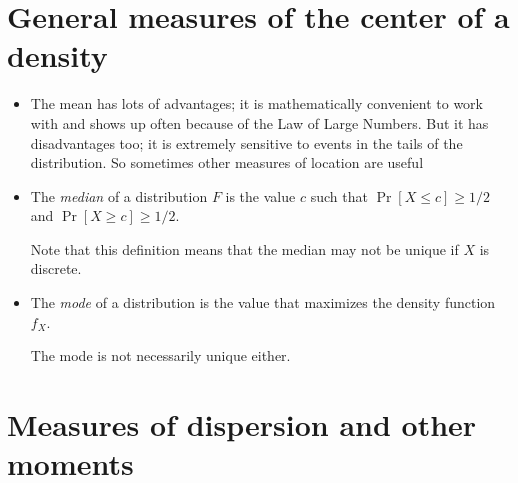 \begin{itemize}
\end{itemize}

\section{General measures of the center of a density}

\begin{itemize}

\item The mean has lots of advantages; it is mathematically convenient
  to work with and shows up often because of the Law of Large Numbers.
  But it has disadvantages too; it is extremely sensitive to events in
  the tails of the distribution.  So sometimes other measures of
  location are useful

\item %
  \begin{defn}
    The \emph{median} of a distribution $F$ is the value $c$ such that
    $\Pr[X ≤ c] ≥ 1/2$ and $\Pr[X ≥ c] ≥ 1/2$.
  \end{defn}
  Note that this definition means that the median may not be unique if
  $X$ is discrete.

\item %
  \begin{defn}
    The \emph{mode} of a distribution is the value that maximizes
    the density function $f_X$.
  \end{defn}
  The mode is not necessarily unique either.

\end{itemize}

\section{Measures of dispersion and other moments}

